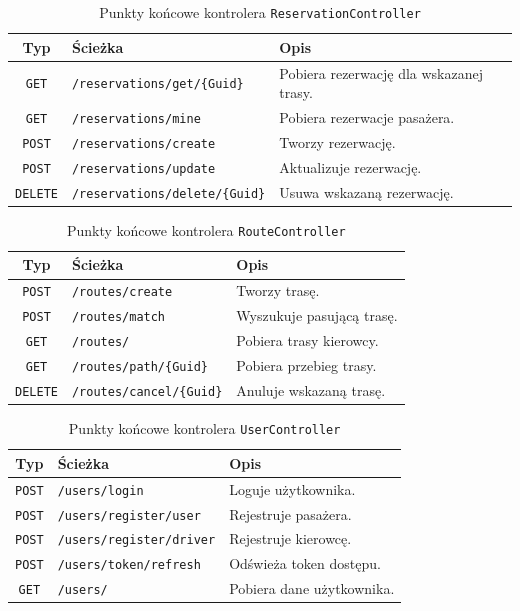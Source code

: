 \begin{table}[htb]
\small
\centering
\caption{Punkty końcowe kontrolera \texttt{ReservationController}}
\label{tab:endpoints-reservation}
\begin{tabularx}{\linewidth}{|c|X|X|} \hline
Typ & Ścieżka & Opis \\ \hline\hline
\texttt{GET} & \texttt{/reservations/get/\{Guid\}} & Pobiera rezerwację dla wskazanej trasy. \\ \hline
\texttt{GET} & \texttt{/reservations/mine} & Pobiera rezerwacje pasażera. \\ \hline
\texttt{POST} & \texttt{/reservations/create} & Tworzy rezerwację. \\ \hline
\texttt{POST} & \texttt{/reservations/update} & Aktualizuje rezerwację. \\ \hline
\texttt{DELETE} & \texttt{/reservations/delete/\{Guid\}} & Usuwa wskazaną rezerwację. \\ \hline
\end{tabularx}
\end{table}

\begin{table}[htb]
\small
\centering
\caption{Punkty końcowe kontrolera \texttt{RouteController}}
\label{tab:endpoints-route}
\begin{tabularx}{\linewidth}{|c|X|X|} \hline
Typ & Ścieżka & Opis \\ \hline\hline
\texttt{POST} & \texttt{/routes/create} & Tworzy trasę. \\ \hline
\texttt{POST} & \texttt{/routes/match} & Wyszukuje pasującą trasę. \\ \hline
\texttt{GET} & \texttt{/routes/} & Pobiera trasy kierowcy. \\ \hline
\texttt{GET} & \texttt{/routes/path/\{Guid\}} & Pobiera przebieg trasy. \\ \hline
\texttt{DELETE} & \texttt{/routes/cancel/\{Guid\}} & Anuluje wskazaną trasę. \\ \hline
\end{tabularx}
\end{table}

\begin{table}[htb]
\small
\centering
\caption{Punkty końcowe kontrolera \texttt{UserController}}
\label{tab:endpoints-user}
\begin{tabularx}{\linewidth}{|c|X|X|} \hline
Typ & Ścieżka & Opis \\ \hline\hline
\texttt{POST} & \texttt{/users/login} & Loguje użytkownika. \\ \hline
\texttt{POST} & \texttt{/users/register/user} & Rejestruje pasażera. \\ \hline
\texttt{POST} & \texttt{/users/register/driver} & Rejestruje kierowcę. \\ \hline
\texttt{POST} & \texttt{/users/token/refresh} & Odświeża token dostępu. \\ \hline
\texttt{GET} & \texttt{/users/} & Pobiera dane użytkownika. \\ \hline
\end{tabularx}
\end{table}

